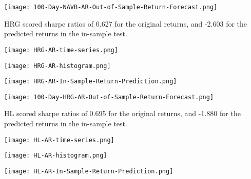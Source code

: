 \begin{center}
    \texttt{[image: 100-Day-NAVB-AR-Out-of-Sample-Return-Forecast.png]}
    \label{fig:nonfloat}
\end{center}

HRG scored sharpe ratios of 0.627 for the original returns, and -2.603 for the predicted returns in the in-sample test.

\begin{center}  
    \texttt{[image: HRG-AR-time-series.png]}
    \label{fig:nonfloat}
\end{center}

\begin{center}
  
    \texttt{[image: HRG-AR-histogram.png]}
    \label{fig:nonfloat}
\end{center}

\begin{center}
    \texttt{[image: HRG-AR-In-Sample-Return-Prediction.png]}
    \label{fig:nonfloat}
\end{center}

\begin{center}
    \texttt{[image: 100-Day-HRG-AR-Out-of-Sample-Return-Forecast.png]}
    \label{fig:nonfloat}
\end{center}

HL scored sharpe ratios of 0.695 for the original returns, and -1.880 for the predicted returns in the in-sample test.

\begin{center}  
    \texttt{[image: HL-AR-time-series.png]}
    \label{fig:nonfloat}
\end{center}

\begin{center}
    \texttt{[image: HL-AR-histogram.png]}
    \label{fig:nonfloat}
\end{center}

\begin{center}
  
    \texttt{[image: HL-AR-In-Sample-Return-Prediction.png]}
    \label{fig:nonfloat}
\end{center}

